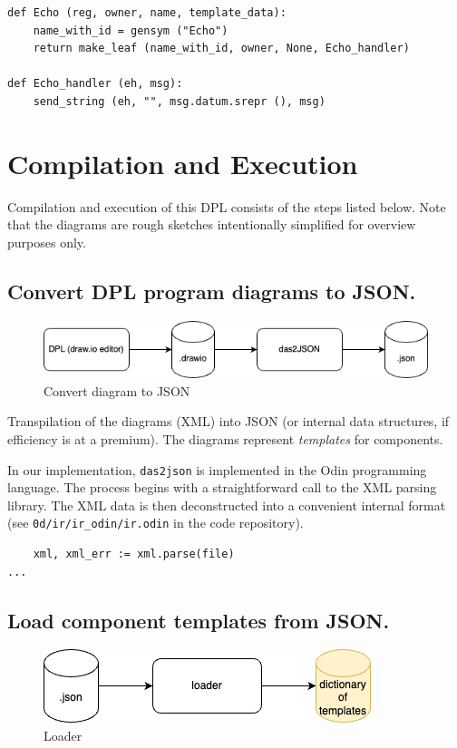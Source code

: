 \documentclass[10pt,anonymous,review]{acmart}
\begin{document}
\begin{verbatim}
def Echo (reg, owner, name, template_data):
    name_with_id = gensym ("Echo")
    return make_leaf (name_with_id, owner, None, Echo_handler)

def Echo_handler (eh, msg):
    send_string (eh, "", msg.datum.srepr (), msg)
\end{verbatim}

\section{Compilation and Execution}
Compilation and execution of this DPL consists of the steps listed below. Note that the diagrams are rough sketches intentionally simplified
for overview purposes only.

\subsection{Convert DPL program diagrams to JSON.}

  \begin{figure}[h]
    \centering
    \includegraphics[width=0.6\linewidth]{./media/convert.png}
    \caption{Convert diagram to JSON}
    \label{fig:convert_to_json}
  \end{figure}

  Transpilation of the diagrams (XML) into JSON (or internal data structures, if efficiency is at a premium). The diagrams represent \emph{templates} for components.
  
  In our implementation, \texttt{das2json} is implemented\cite{d2jrepo} in the Odin programming language. The process begins with a straightforward call to the XML parsing library. The XML data is then deconstructed into a convenient internal format (see \texttt{0d/ir/ir\_odin/ir.odin} in the code repository).

\begin{verbatim}
    xml, xml_err := xml.parse(file)
...
\end{verbatim}
  
\subsection{Load component templates from JSON.}
  \begin{figure}[h]
    \includegraphics[scale=0.4]{./media/loader.png}
    \caption{Loader}
    \label{fig:load_templates}
  \end{figure}
\end{document}
